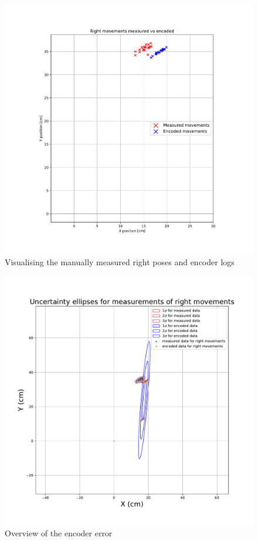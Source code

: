         
      \begin{figure}[!ht] 
            \centering 
            \includegraphics[page={1}, scale=.50]{images/pdf/right_movements_measured_and_encoded.pdf}
            \caption{Visualising the manually measured right poses and encoder logs}
            \label{fig:encoder-3}
    \end{figure}

    
        \begin{figure}[!ht] 
            \centering 
            \includegraphics[page={1}, scale=.30]{images/pdf/ellipses_right_measured_vs_all_encoded.pdf}
            \caption{Overview of the encoder error}
            \label{fig:encoder-4}
    \end{figure}
    
